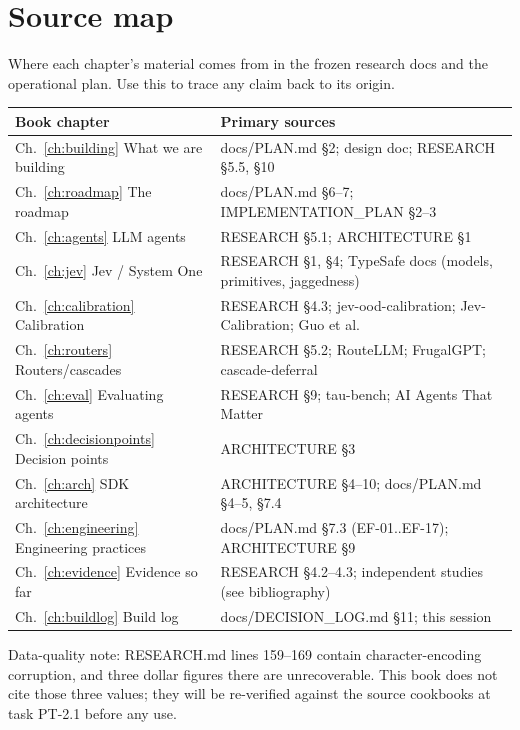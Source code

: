 \chapter{Source map}
\label{app:sourcemap}

Where each chapter's material comes from in the frozen research docs and the operational
plan. Use this to trace any claim back to its origin.

\begin{longtable}{@{}p{5.2cm}p{7.0cm}@{}}
\toprule
Book chapter & Primary sources \\
\midrule
\endhead
Ch.~\ref{ch:building} What we are building & docs/PLAN.md \S2; design doc; RESEARCH \S5.5, \S10 \\
Ch.~\ref{ch:roadmap} The roadmap & docs/PLAN.md \S6--7; IMPLEMENTATION\_PLAN \S2--3 \\
Ch.~\ref{ch:agents} LLM agents & RESEARCH \S5.1; ARCHITECTURE \S1 \\
Ch.~\ref{ch:jev} Jev / System One & RESEARCH \S1, \S4; TypeSafe docs (models, primitives, jaggedness) \\
Ch.~\ref{ch:calibration} Calibration & RESEARCH \S4.3; jev-ood-calibration; Jev-Calibration; Guo et al. \\
Ch.~\ref{ch:routers} Routers/cascades & RESEARCH \S5.2; RouteLLM; FrugalGPT; cascade-deferral \\
Ch.~\ref{ch:eval} Evaluating agents & RESEARCH \S9; tau-bench; AI Agents That Matter \\
Ch.~\ref{ch:decisionpoints} Decision points & ARCHITECTURE \S3 \\
Ch.~\ref{ch:arch} SDK architecture & ARCHITECTURE \S4--10; docs/PLAN.md \S4--5, \S7.4 \\
Ch.~\ref{ch:engineering} Engineering practices & docs/PLAN.md \S7.3 (EF-01..EF-17); ARCHITECTURE \S9 \\
Ch.~\ref{ch:evidence} Evidence so far & RESEARCH \S4.2--4.3; independent studies (see bibliography) \\
Ch.~\ref{ch:buildlog} Build log & docs/DECISION\_LOG.md \S11; this session \\
\bottomrule
\end{longtable}

\begin{whyhere}
Data-quality note: RESEARCH.md lines 159--169 contain character-encoding corruption, and
three dollar figures there are unrecoverable. This book does not cite those three values;
they will be re-verified against the source cookbooks at task PT-2.1 before any use.
\end{whyhere}
